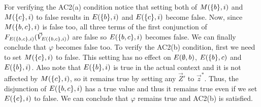 \begin{example}
    For verifying the AC2(a) condition notice that setting both of
    $M(\{b\},i)$ and $M(\{c\},i)$ to false results in
    $E(\{b\},i)$ and $E(\{c\},i)$ become false.
    Now, since $M(\{b,c\},i)$ is false too, all three terms of the first
    conjunction of $F_{E(\{b,c\},i)}(\vec V_{E(\{b,c\},i)})$ are false so $E(\{b,c\},i)$ becomes false.
    We can finally conclude that $\varphi$ becomes false too.
    To verify the AC2(b) condition, first we need to set $M(\{c\},i)$ to false.
    This setting has no effect on $E(\emptyset,b)$, $E(\{b\},c)$ and $E(\{b\},i)$.
    Also note that $E(\{b\},i)$ is true in the actual context and it is
    not affected by $M(\{c\},i)$, so it remains true by setting
    any $\vec Z'$ to $\vec z^*$.
    Thus, the disjunction of $E(\{b,c\},i)$ has a true value and thus it
    remains true even if we set $E(\{c\},i)$ to false.
    We can conclude that $\varphi$ remains true and AC2(b) is satisfied.
\end{example}


